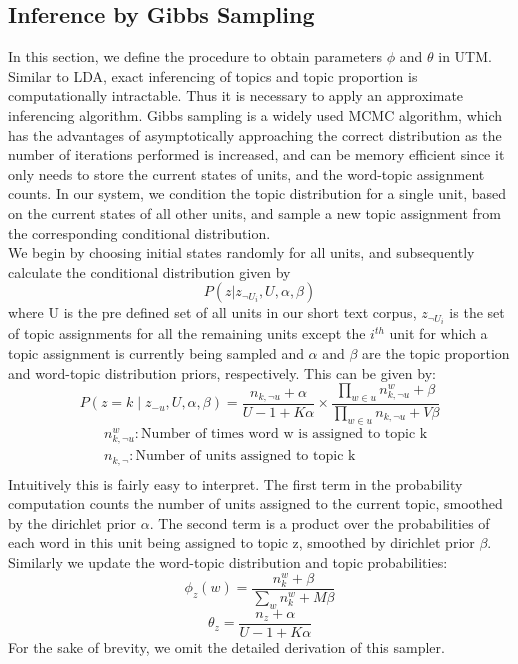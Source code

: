 \documentclass{sig-alternate-05-2015}
\begin{document}
\subsection{Inference by Gibbs Sampling}
In this section, we define the procedure to obtain parameters $\phi$ and $\theta$ in UTM. Similar to LDA, exact inferencing of topics and topic proportion is computationally intractable. Thus it is necessary to apply an approximate inferencing algorithm. Gibbs sampling is a widely used MCMC algorithm, which has the advantages of asymptotically approaching the correct distribution as the number of iterations performed is increased, and can be memory efficient since it only needs to store the current states of units, and the word-topic assignment counts. In our system, we condition the topic distribution for a single unit, based on the current states of all other units, and sample a new topic assignment from the corresponding conditional distribution.
\\[10pt]
We begin by choosing initial states randomly for all units, and subsequently calculate the conditional distribution given by $$P(z | z_{\neg U _{i}}, U, \alpha, \beta)$$  where U is the pre defined set of all units in our short text corpus, $z_{\neg U_{i}}$ is the set of topic assignments for all the remaining units except the $i^{th}$ unit for which a topic assignment is currently being sampled and $\alpha$ and $\beta$ are the topic proportion and word-topic distribution priors, respectively. This can be given by:
\[ P(z=k \mid z_{-u} , U, \alpha, \beta) = \frac{n_{k, \neg u} + \alpha}{U-1 + K \alpha} \times \frac{\prod\limits_{w \in u} n^w_{k, \neg u} + \beta }{\prod\limits_{w \in u} n_{k, \neg u} + V \beta} \]
\begin{align*}
& n^w_{k, \neg u} : \text{Number of times word w is assigned to topic k} \\
& n_{k, \neg } : \text{Number of units assigned to topic k} \\
\end{align*}
Intuitively this is fairly easy to interpret. The first term in the probability computation counts the number of units assigned to the current topic, smoothed by the dirichlet prior $\alpha$. The second term is a product over the probabilities of each word in this unit being assigned to topic z, smoothed by dirichlet prior $\beta$. Similarly we update the word-topic distribution and topic probabilities: \\
$$\phi_{z}(w) = \frac{n^w_{k} + \beta}{\sum_{w}{n^w_k} + M\beta}$$
$$\theta_{z} = \frac{n_{z} + \alpha}{U-1 + K\alpha}$$
For the sake of brevity, we omit the detailed derivation of this sampler.
\end{document}
